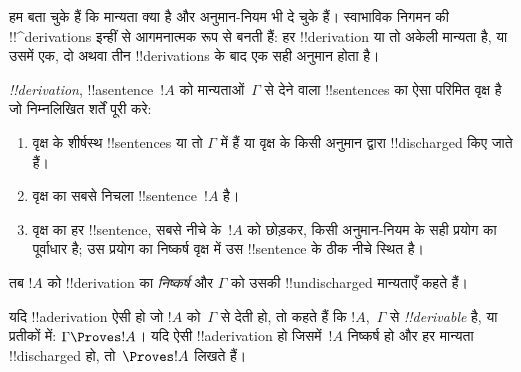 \documentclass[../../../include/open-logic-section]{subfiles}
\begin{document}
      {}
      {}


\begin{explain}
हम बता चुके हैं कि मान्यता क्या है और अनुमान-नियम भी दे चुके हैं। स्वाभाविक
निगमन की !!^{derivation}s इन्हीं से आगमनात्मक रूप से बनती हैं: हर
!!{derivation} या तो अकेली मान्यता है, या उसमें एक, दो अथवा तीन
!!{derivation}s के बाद एक सही अनुमान होता है।
\end{explain}

\begin{defn}[!!^{derivation}]
 \emph{!!{derivation}}, !!a{sentence}~$!A$ को
मान्यताओं~$\Gamma$ से देने वाला !!{sentence}s का ऐसा परिमित वृक्ष है जो
निम्नलिखित शर्तें पूरी करे:
\begin{enumerate}
\item वृक्ष के शीर्षस्थ !!{sentence}s या तो $\Gamma$ में हैं या वृक्ष के किसी
  अनुमान द्वारा !!{discharged} किए जाते हैं।
\item वृक्ष का सबसे निचला !!{sentence}~$!A$ है।
\item वृक्ष का हर !!{sentence}, सबसे नीचे के~$!A$ को छोड़कर, किसी अनुमान-नियम
  के सही प्रयोग का पूर्वाधार है; उस प्रयोग का निष्कर्ष वृक्ष में उस
  !!{sentence} के ठीक नीचे स्थित है।
\end{enumerate}
तब $!A$ को !!{derivation} का \emph{निष्कर्ष} और $\Gamma$ को उसकी
!!{undischarged} मान्यताएँ कहते हैं।

यदि !!a{derivation} ऐसी हो जो $!A$ को~$\Gamma$ से देती हो, तो कहते हैं कि
$!A$,~$\Gamma$ से \emph{!!{derivable}} है, या प्रतीकों में: $\Gamma \Proves
!A$। यदि ऐसी !!a{derivation} हो जिसमें~$!A$ निष्कर्ष हो और हर मान्यता
!!{discharged} हो, तो~$\Proves !A$ लिखते हैं।
\end{defn}
\end{document}
